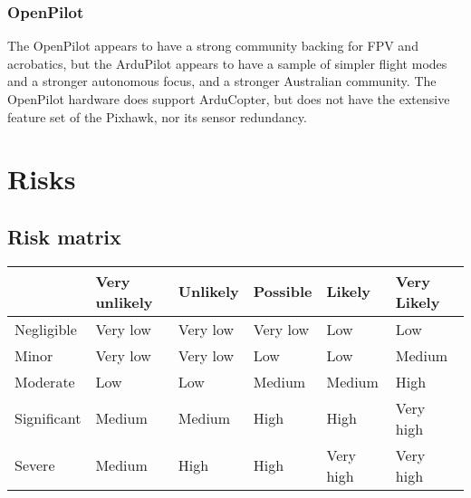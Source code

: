 \documentclass[a4paper, 11pt, titlepage]{article}
\begin{document}
\subsubsection{OpenPilot}
The OpenPilot appears to have a strong community backing for FPV and acrobatics, but the ArduPilot appears to have a sample of simpler flight modes and a stronger autonomous focus, and a stronger Australian community.
The OpenPilot hardware does support ArduCopter, but does not have the extensive feature set of the Pixhawk, nor its sensor redundancy.

\section{Risks}
\subsection{Risk matrix}
\begin{table}[H]
	\centering
	\begin{tabular}{|l|l|l|l|l|l|}
		\hline
		&  Very unlikely & Unlikely & Possible & Likely & Very Likely \\
		\hline
		Negligible & \cellcolor{vlowrisk} Very low & \cellcolor{vlowrisk} Very low & \cellcolor{vlowrisk} Very low & \cellcolor{lowrisk} Low & \cellcolor{lowrisk} Low \\ \hline
		Minor & \cellcolor{vlowrisk} Very low & \cellcolor{vlowrisk} Very low & \cellcolor{lowrisk} Low & \cellcolor{lowrisk} Low & \cellcolor{mediumrisk} Medium \\ \hline
		Moderate & \cellcolor{lowrisk} Low & \cellcolor{lowrisk} Low & \cellcolor{mediumrisk} Medium & \cellcolor{mediumrisk} Medium & \cellcolor{highrisk} High \\ \hline
		Significant & \cellcolor{mediumrisk} Medium & \cellcolor{mediumrisk} Medium & \cellcolor{highrisk} High & \cellcolor{highrisk} High & \cellcolor{veryhighrisk} Very high \\ \hline
		Severe & \cellcolor{mediumrisk} Medium & \cellcolor{highrisk} High & \cellcolor{highrisk} High & \cellcolor{veryhighrisk}Very high & \cellcolor{veryhighrisk}Very high \\ \hline
	\end{tabular}
\end{table}
\end{document}
